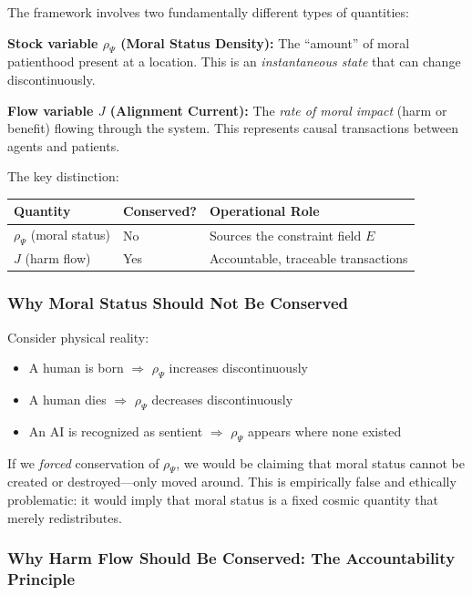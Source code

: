 \documentclass[12pt]{article}
\begin{document}
The framework involves two fundamentally different types of quantities:

\textbf{Stock variable $\rho_\Psi$ (Moral Status Density):} The ``amount'' of moral patienthood present at a
location. This is an \emph{instantaneous state} that can change discontinuously.

\textbf{Flow variable $J$ (Alignment Current):} The \emph{rate of moral impact} (harm or benefit) flowing
through the system. This represents causal transactions between agents and patients.

The key distinction:

\begin{table}[h]
\centering
\begin{tabular}{lll}
\toprule
\textbf{Quantity} & \textbf{Conserved?} & \textbf{Operational Role} \\
\midrule
$\rho_\Psi$ (moral status) & No & Sources the constraint field $E$ \\
$J$ (harm flow) & Yes & Accountable, traceable transactions \\
\bottomrule
\end{tabular}
\end{table}

\subsubsection{Why Moral Status Should Not Be Conserved}

Consider physical reality:
\begin{itemize}
\item A human is born $\Rightarrow$ $\rho_\Psi$ increases discontinuously
\item A human dies $\Rightarrow$ $\rho_\Psi$ decreases discontinuously
\item An AI is recognized as sentient $\Rightarrow$ $\rho_\Psi$ appears where none existed
\end{itemize}

If we \emph{forced} conservation of $\rho_\Psi$, we would be claiming that moral status cannot be created or
destroyed---only moved around. This is empirically false and ethically problematic: it would imply
that moral status is a fixed cosmic quantity that merely redistributes.

\subsubsection{Why Harm Flow Should Be Conserved: The Accountability Principle}
\end{document}
